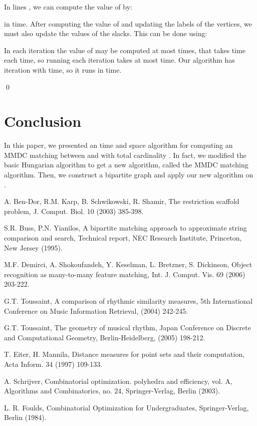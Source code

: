 \documentclass[preprint,12pt]{elsarticle}
\begin{document}
In lines , we can compute the value of  by:

in  time. After computing the value of  and updating the labels of the vertices, we must also update the values of the slacks. This can be done using:
 
In each iteration the value of  may be computed at most  times, that takes  time each time, so running each iteration takes at most  time.
Our algorithm has  iteration with  time, so it runs in  time. 

\qed



\section{Conclusion}
\label{ConclusionSect}
In this paper, we presented an  time and  space algorithm for computing an MMDC matching between  and  with total cardinality . In fact, we modified the basic Hungarian algorithm to get a new algorithm, called the MMDC matching algorithm. Then, we construct a bipartite graph  and apply our new algorithm on .

\begin{thebibliography}{8}


A. Ben-Dor, R.M. Karp, B. Schwikowski, R. Shamir, The restriction scaffold problem, J. Comput. Biol. 10 (2003) 385-398.

S.R. Buss, P.N. Yianilos, A bipartite matching approach to approximate string comparison and search, Technical report, NEC Research Institute, Princeton, New Jersey (1995).

M.F. Demirci, A. Shokoufandeh, Y. Keselman, L. Bretzner, S. Dickinson, Object recognition as many-to-many feature matching, Int. J. Comput. Vis. 69 (2006) 203-222.

G.T. Toussaint, A comparison of rhythmic similarity measures, 5th International Conference on Music Information Retrieval, (2004) 242-245.


G.T. Toussaint, The geometry of musical rhythm, Japan Conference on Discrete and Computational Geometry, Berlin-Heidelberg, (2005) 198-212.

T. Eiter, H. Mannila, Distance measures for point sets and their computation, Acta Inform. 34 (1997) 109-133.

A. Schrijver, Combinatorial optimization. polyhedra and efficiency, vol. A, Algorithms and Combinatorics, no. 24, Springer-Verlag, Berlin (2003).

 L. R. Foulds, Combinatorial Optimization for Undergraduates, Springer-Verlag, Berlin (1984).

\end{thebibliography}
\end{document}
